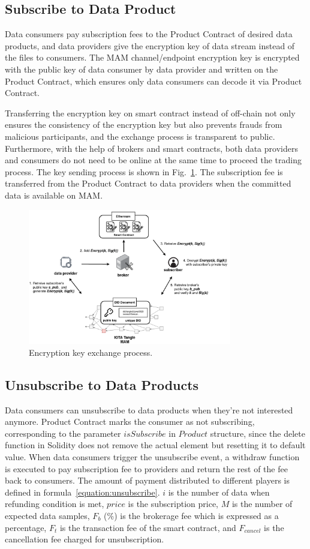 \documentclass[conference]{IEEEtran}
\begin{document}
\subsection{Subscribe to Data Product}
Data consumers pay subscription fees to the Product Contract of desired data products, and data providers give the encryption key of data stream instead of the files to consumers. The MAM channel/endpoint encryption key is encrypted with the public key of data consumer by data provider and written on the Product Contract, which ensures only data consumers can decode it via Product Contract.

Transferring the encryption key on smart contract instead of off-chain not only ensures the consistency of the encryption key but also prevents frauds from malicious participants, and the exchange process is transparent to public. Furthermore, with the help of brokers and smart contracts, both data providers and consumers do not need to be online at the same time to proceed the trading process. The key sending process is shown in Fig.~\ref{fig:key_exchange}. The subscription fee is transferred from the Product Contract to data providers when the committed data is available on MAM.

\begin{figure}[!t]
    \centering
    \includegraphics[width=3.5in]{key_exchange}
    \caption{Encryption key exchange process.}
    \label{fig:key_exchange}
\end{figure}

\subsection{Unsubscribe to Data Products}
Data consumers can unsubscribe to data products when they're not interested anymore. Product Contract marks the consumer as not subscribing, corresponding to the parameter $isSubscribe$ in $Product$ structure, since the delete function in Solidity does not remove the actual element but resetting it to default value. When data consumers trigger the unsubscribe event, a withdraw function is executed to pay subscription fee to providers and return the rest of the fee back to consumers. The amount of payment distributed to different players is defined in formula~\ref{equation:unsubscribe}. $i$ is the number of data when refunding condition is met, $price$  is the subscription price, $M$ is the number of expected data samples, $F_{b}$ (\%) is the brokerage fee which is expressed as a percentage, $F_{t}$ is the transaction fee of the smart contract, and $F_{cancel}$ is the cancellation fee charged for unsubscription. 
\end{document}

